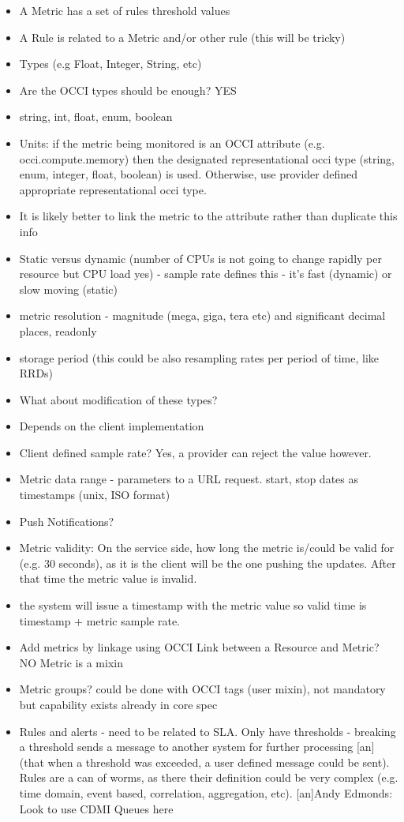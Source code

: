 \documentclass[12pt]{article}  %
\begin{document}
\begin{itemize}
\item A Metric has a set of rules threshold values
\item A Rule is related to a Metric and/or other rule (this will be tricky)
\item Types (e.g Float, Integer, String, etc) 
\item Are the OCCI types should be enough? YES
\item string, int, float, enum, boolean
\item Units: if the metric being monitored is an OCCI attribute (e.g. occi.compute.memory) then the designated representational occi type (string, enum, integer, float, boolean) is used. Otherwise, use provider defined appropriate representational occi type.
\item It is likely better to link the metric to the attribute rather than duplicate this info
\item Static versus dynamic (number of CPUs is not going to change rapidly per resource but CPU load yes) - sample rate defines this - it’s fast (dynamic) or slow moving (static)
\item metric resolution - magnitude (mega, giga, tera etc) and significant decimal places, readonly
\item storage period (this could be also resampling rates per period of time, like RRDs)
\item What about modification of these types?
\item Depends on the client implementation
\item Client defined sample rate? Yes, a provider can reject the value however.
\item Metric data range - parameters to a URL request. start, stop dates as timestamps (unix, ISO format)
\item Push Notifications?
\item Metric validity: On the service side, how long the metric is/could be valid for (e.g. 30 seconds), as it is the client will be the one pushing the updates. After that time the metric value is invalid.
\item the system will issue a timestamp with the metric value so valid time is timestamp + metric sample rate.
\item Add metrics by linkage using OCCI Link between a Resource and Metric? NO Metric is a mixin
\item Metric groups? could be done with OCCI tags (user mixin), not mandatory but capability exists already in core spec
\item Rules and alerts - need to be related to SLA. Only have thresholds - breaking a threshold sends a message to another system for further processing [an](that when a threshold was exceeded, a user defined message could be sent).  Rules are a can of worms, as there their definition could be very complex (e.g. time domain, event based, correlation, aggregation, etc).
{
\color{blue}
[an]Andy Edmonds:
Look to use CDMI Queues here
}


\end{itemize}
\end{document}
